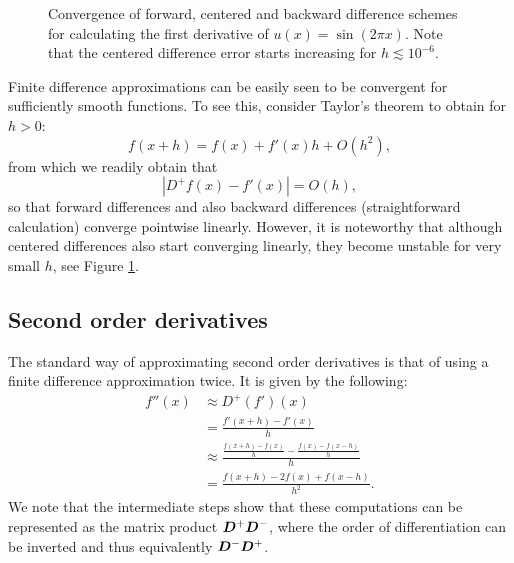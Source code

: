 \documentclass{article}
\newcommand{\mat}{\matrixsym}
\begin{document}
\begin{figure}[ht]
    \centering
    \caption{Convergence of forward, centered and backward difference schemes for calculating the first derivative of $u(x)=\sin(2\pi x)$. Note that the centered difference error starts increasing for $h\lesssim 10^{-6}$.}
    \label{fig:fd_convergence}
\end{figure}

Finite difference approximations can be easily seen to be convergent for sufficiently smooth functions. To see this, consider Taylor's theorem to obtain for $h>0$:
    $$ f(x+ h) = f(x) + f'(x)h + O(h^2), $$
from which we readily obtain that 
    $$ | D^+f(x) - f'(x) | = O(h), $$
    so that forward differences and also backward differences (straightforward calculation) converge pointwise linearly. However, it is noteworthy that although centered differences also start converging linearly, they become unstable for very small $h$, see  Figure \ref{fig:fd_convergence}.

\subsection{Second order derivatives}
The standard way of approximating second order derivatives is that of using a finite difference approximation twice. It is given by the following: 
$$ \begin{aligned}
    f''(x) &\approx D^+(f')(x) \\
           &=\frac{f'(x+h) - f'(x)}{h} \\
           &\approx\frac{\frac{f(x+h) - f(x)}{h} - \frac{f(x) - f(x-h)}{h}}{h} \\
           &= \frac{f(x+h) - 2f(x) + f(x-h)}{h^2}.
    \end{aligned}
$$
We note that the intermediate steps show that these computations can be represented as the matrix product $\mat D^+ \mat D^-$, where the order of differentiation can be inverted and thus equivalently $\mat D^- \mat D^+$. 
\end{document}
